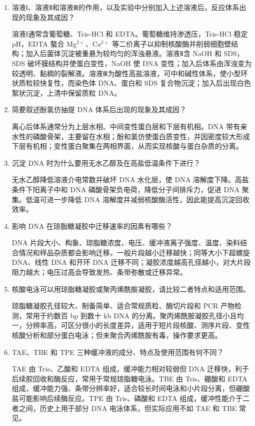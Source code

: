 \documentclass[a4paper]{article}
\begin{document}
\begin{enumerate}[label=\arabic*.]
	\item 溶液Ⅰ、溶液Ⅱ和溶液Ⅲ的作用，以及实验中分别加入上述溶液后，反应体系出现的现象及其成因？

	溶液Ⅰ通常含葡萄糖、Tris-HCl 和 EDTA。葡萄糖维持渗透压，Tris-HCl 稳定 pH，EDTA 螯合 Mg$^{2+}$、Ca$^{2+}$ 等二价离子以抑制核酸酶并削弱细胞壁结构；加入后菌体沉淀被重悬为较均匀的浑浊悬液。溶液Ⅱ含 NaOH 和 SDS，SDS 破坏膜结构并使蛋白变性，NaOH 使 DNA 变性；加入后体系由浑浊变为较透明、黏稠的裂解液。溶液Ⅲ为酸性高盐溶液，可中和碱性体系，使小型环状质粒较快复性，而染色体 DNA、蛋白和 SDS 复合物沉淀；加入后出现白色絮状沉淀，上清中保留质粒 DNA。

	\item 简要叙述酚氯仿抽提 DNA 体系后出现的现象及其成因？

	离心后体系通常分为上层水相、中间变性蛋白层和下层有机相。DNA 带有亲水性的磷酸骨架，主要留在水相；酚和氯仿使蛋白质变性，并因密度较大形成下层有机相；变性蛋白聚集在两相界面，从而实现核酸与蛋白杂质的分离。

	\item 沉淀 DNA 时为什么要用无水乙醇及在高盐低温条件下进行？

	无水乙醇降低溶液介电常数并破坏 DNA 水化层，使 DNA 溶解度下降。高盐条件下阳离子中和 DNA 磷酸骨架负电荷，降低分子间排斥力，促进 DNA 聚集。低温可进一步降低 DNA 溶解度并减弱核酸酶活性，因此能提高沉淀回收效率。

	\item 影响 DNA 在琼脂糖凝胶中迁移速率的因素有哪些？

	DNA 片段大小、构象、琼脂糖浓度、电压、缓冲液离子强度、温度、染料结合情况和样品杂质都会影响迁移。一般片段越小迁移越快；同等大小下超螺旋 DNA、线性 DNA 和开环 DNA 迁移不同；凝胶浓度越高孔径越小，对大片段阻力越大；电压过高会导致发热、条带弥散或迁移异常。

	\item 核酸电泳可以用琼脂糖凝胶或聚丙烯酰胺凝胶，请比较二者特点和适用范围。

	琼脂糖凝胶孔径较大、制备简单、适合常规质粒、酶切片段和 PCR 产物检测，常用于约数百 bp 到数十 kb DNA 的分离。聚丙烯酰胺凝胶孔径小且均一，分辨率高，可区分很小的长度差异，适用于短片段核酸、测序片段、变性核酸分析和部分蛋白电泳；但未聚合丙烯酰胺有毒，操作要求更高。

	\item TAE、TBE 和 TPE 三种缓冲液的成分、特点及使用范围有何不同？

	TAE 由 Tris、乙酸和 EDTA 组成，缓冲能力相对较弱但 DNA 迁移快，利于后续胶回收和酶反应，常用于常规琼脂糖电泳。TBE 由 Tris、硼酸和 EDTA 组成，缓冲能力强、条带分辨率好，适合较长时间电泳和小片段分离，但硼酸盐可能影响后续酶反应。TPE 由 Tris、磷酸和 EDTA 组成，缓冲性能介于二者之间，历史上用于部分 DNA 电泳体系，但实际应用不如 TAE 和 TBE 常见。


\end{enumerate}
\end{document}

